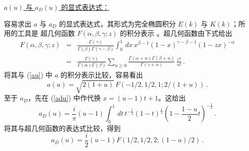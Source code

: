 


\noindent\underline{$a(u)$ 与 $a_D(u)$ 的显式表达式：}

容易求出 $a$ 与 $a_D$ 的显式表达式，其形式为完全椭圆积分 $E(k)$ 与 $K(k)$；所用的工具是
超几何函数 $F(\alpha,\beta,\gamma;z)$ 的积分表示 \cite{GR}。超几何函数由下式给出
\begin{eqnarray}
F(\alpha,\beta,\gamma;z)&=& \frac{\Gamma(\gamma)}{\Gamma(\beta)
\Gamma(\gamma-\beta)}\int_0^1\,dx\,x^{\beta-1} (1-x)^{\gamma-\beta-1}
(1-zx)^{-\alpha}\nonumber\\ 
&=& \frac{\Gamma(\gamma)}{\Gamma(\alpha)\Gamma(\beta)}\sum_{n\geq 0}
\frac{\Gamma(\alpha +n)\Gamma(\beta +n)}{\Gamma(\gamma +n)}\,
\frac{z^n}{n!}\,.\nonumber
\end{eqnarray}
将其与 (\ref{au}) 中 $a$ 的积分表示比较，容易看出
$$
a(u)=\sqrt{2(1+u)}\, F\left(-1/2, 1/2, 1; 2/(1+u)\right)\,.
$$
至于 $a_D$，先在 (\ref{adu}) 中作代换 $x=(u-1)t+1$。这给出
$$
a_D(u)=\frac{i}{\pi} (u-1)\int_0^1\,dt\,t^{-\frac{1}{2}}
(1-t)^{\frac{1}{2}} (1-\frac{1-u}{2} t)^{-\frac{1}{2}}\,. 
$$
将其与超几何函数的表达式比较，得到
$$
a_D(u)=\frac{i}{2} (u-1) F\left(1/2, 1/2, 2; (1-u)/2\right)\,.
$$


